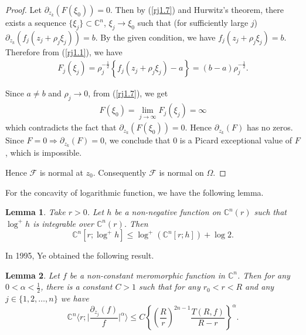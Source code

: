 \documentclass[11pt, reqno]{amsart}
\newtheorem*{cor A}{Corollary A}
\newtheorem*{cor B}{Corollary B}
\newtheorem{lem}{Lemma}[section]
\numberwithin{equation}{section}
\begin{document}
\begin{proof}
Let $\partial_{z_k}(F(\xi_{0}))=0$. Then by (\ref{rj1.7}) and Hurwitz's theorem, there exists a sequence $\{\xi_{j}\}\subset\mathbb{C}^n$, $\xi_{j}\rightarrow \xi_{0}$ such that (for sufficiently large $j$) $\partial_{z_k}(f_j(z_{j}+\rho_{j}\xi_{j}))=b$. 
By the given condition, we have $f_j(z_{j}+\rho_{j}\xi_{j})=b$. Therefore from (\ref{rj1.1}), we have
\begin{align}\label{rj1.7}
F_j(\xi_{j})=\rho_j^{-\frac{1}{2}}\left\lbrace f_j(z_j+\rho_j \xi_j)-a\right\rbrace=(b-a)\rho_j^{-\frac{1}{2}}.
\end{align}

Since $a\neq b$ and $\rho_j\to 0$, from (\ref{rj1.7}), we get
\begin{align*}
F(\xi_0)=\lim\limits_{j\to \infty} F_j(\xi_{j})=\infty
\end{align*}
which contradicts the fact that $\partial_{z_k}(F(\xi_{0}))=0$. Hence $\partial_{z_k}(F)$ has no zeros. Since $F=0\Rightarrow \partial_{z_k}(F)=0$, we conclude that $0$ is a Picard exceptional value of $F$, which is impossible.

Hence $\mathcal{F}$ is normal at $z_0$. Consequently $\mathcal{F}$ is normal on $\Omega$. 
\end{proof}

For the concavity of logarithmic function, we have the following lemma.
\begin{lem}\cite[Lemma 1.32]{Hu-Li-Yang-2003} \label{ln2.7} Take $r>0$. Let $h$ be a non-negative function on $\mathbb{C}^n(r)$ such that $\log^+ h$ is integrable over $\mathbb{C}^n(r)$. Then 
\[\mathbb{C}^n[r;\log^+h]\leq \log^+(\mathbb{C}^n[r;h])+\log 2.\]
\end{lem}

In 1995, Ye \cite{27} obtained the following result.
\begin{lem}\cite[Lemma 4]{27} \label{ln2.8} Let $f$ be a non-constant meromorphic function in $\mathbb{C}^n$. Then for any $0<\alpha<\frac{1}{2}$, there is a constant $C>1$ such that for any $r_0<r<R$ and any $j\in\{1,2,\ldots,n\}$ we have 
\[\mathbb{C}^n\bigg\langle r;\bigg|\frac{\partial_{z_j}(f)}{f}\bigg|^{\alpha}\bigg\rangle\leq C\left\{\left(\frac{R}{r}\right)^{2n-1}\frac{T(R,f)}{R-r}\right\}^{\alpha}.\]
\end{lem}
\end{document}
